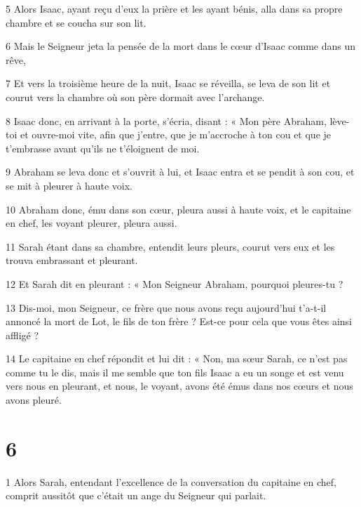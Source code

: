\par 5 Alors Isaac, ayant reçu d'eux la prière et les ayant bénis, alla dans sa propre chambre et se coucha sur son lit.

\par 6 Mais le Seigneur jeta la pensée de la mort dans le cœur d'Isaac comme dans un rêve,

\par 7 Et vers la troisième heure de la nuit, Isaac se réveilla, se leva de son lit et courut vers la chambre où son père dormait avec l'archange.

\par 8 Isaac donc, en arrivant à la porte, s'écria, disant : « Mon père Abraham, lève-toi et ouvre-moi vite, afin que j'entre, que je m'accroche à ton cou et que je t'embrasse avant qu'ils ne t'éloignent de moi.

\par 9 Abraham se leva donc et s'ouvrit à lui, et Isaac entra et se pendit à son cou, et se mit à pleurer à haute voix.

\par 10 Abraham donc, ému dans son cœur, pleura aussi à haute voix, et le capitaine en chef, les voyant pleurer, pleura aussi.

\par 11 Sarah étant dans sa chambre, entendit leurs pleurs, courut vers eux et les trouva embrassant et pleurant.

\par 12 Et Sarah dit en pleurant : « Mon Seigneur Abraham, pourquoi pleures-tu ?

\par 13 Dis-moi, mon Seigneur, ce frère que nous avons reçu aujourd'hui t'a-t-il annoncé la mort de Lot, le fils de ton frère ? Est-ce pour cela que vous êtes ainsi affligé ?

\par 14 Le capitaine en chef répondit et lui dit : « Non, ma sœur Sarah, ce n'est pas comme tu le dis, mais il me semble que ton fils Isaac a eu un songe et est venu vers nous en pleurant, et nous, le voyant, avons été émus dans nos cœurs et nous avons pleuré.

\chapter{6}

\par 1 Alors Sarah, entendant l'excellence de la conversation du capitaine en chef, comprit aussitôt que c'était un ange du Seigneur qui parlait.

